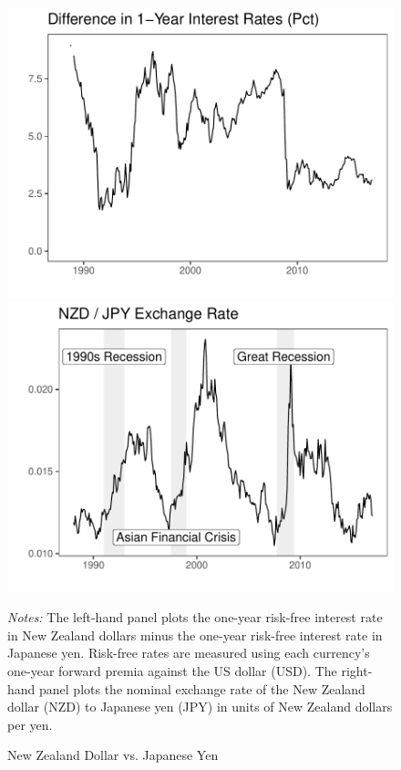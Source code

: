 \documentclass{ar-1col}
\begin{document}
\begin{figure}[htp!]
  \centering
  \caption{New Zealand Dollar vs. Japanese Yen}
  \label{fig:fp}
  \label{fig:spot}
  \begin{minipage}[htp]{0.49\textwidth}
  \includegraphics[width=\textwidth]{Exhibits/Figure_FP12M_DiffJPYNZD.pdf}
  \end{minipage}
  \begin{minipage}[htp]{0.49\textwidth}
  \includegraphics[width=\textwidth]{Exhibits/Figure_FX_JPYNZD.pdf}
  \end{minipage}
  
  \vspace{-1em}
  \begin{minipage}[htp]{\textwidth}
  \scriptsize
  \emph{Notes:} The left-hand panel plots the one-year risk-free interest rate in New Zealand dollars minus the one-year risk-free interest rate in Japanese yen. Risk-free rates are measured using each currency's one-year forward premia against the US dollar (USD). The right-hand panel plots the nominal exchange rate of the New Zealand dollar (NZD) to Japanese yen (JPY) in units of New Zealand dollars per yen. 
  \end{minipage}
\end{figure}
\end{document}
